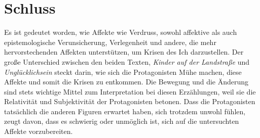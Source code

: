 \documentclass[12pt,a4paper]{article}
\begin{document}
\section{Schluss}
%
Es ist gedeutet worden, wie Affekte wie Verdruss, sowohl affektive als auch epistemologische Verunsicherung, Verlegenheit und andere, die mehr hervorstechenden Affekten unterstützen, um Krisen des Ich darzustellen. Der große Unterschied zwischen den beiden Texten, \textit{Kinder auf der Landstraße} und \textit{Unglücklichsein} steckt darin, wie sich die Protagonisten Mühe machen, diese Affekte und somit die Krisen zu entkommen. Die Bewegung und die Änderung sind stets wichtige Mittel zum Interpretation bei diesen Erzählungen, weil sie die Relativität und Subjektivität der Protagonisten betonen. Dass die Protagonisten tatsächlich die anderen Figuren erwartet haben, sich trotzdem unwohl fühlen, zeugt davon, dass es schwierig oder unmöglich ist, sich auf die untersuchten Affekte vorzubereiten.
\clearpage
\printbibliography[
    title={Literaturverzeichnis}
]
\end{document}
